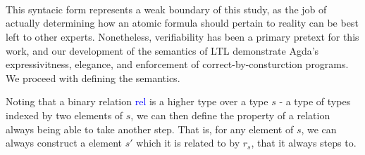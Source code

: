 \documentclass{article}
\newcommand{\blue}[1]{\textcolor{blue}{#1}}
\begin{document}
\begin{code}[hide]%
\>[0]\<%
\\
\>[0]\AgdaSpace{}%
\AgdaSymbol{:}\AgdaSpace{}%
\AgdaSpace{}%
\AgdaSpace{}%
\<%
\\
\>[0]\AgdaSpace{}%
\AgdaSpace{}%
\AgdaSymbol{=}\AgdaSpace{}%
\AgdaSpace{}%
\AgdaSpace{}%
\<%
\\
%
\\[\AgdaEmptyExtraSkip]%
\>[0]\<%
\\
\>[0]\<%
\\
\>[0]\AgdaSpace{}%
\AgdaSymbol{:}\AgdaSpace{}%
\AgdaSpace{}%
\<%
\\
\>[0]\AgdaSpace{}%
\AgdaSpace{}%
\AgdaSymbol{=}\AgdaSpace{}%
\<%
\\
\>[0]\AgdaSpace{}%
\AgdaSpace{}%
\AgdaSymbol{=}\AgdaSpace{}%
\<%
\end{code}

This syntacic form represents a weak boundary of this study, as the job of actually
determining how an atomic formula should pertain to reality can be best left to other
experts. Nonetheless, verifiability has been a primary pretext for this work,
and our development of the semantics of LTL demonstrate Agda's expressivitness,
elegance, and enforcement of correct-by-consturction programs. We proceed with defining the semantics.

Noting that a binary relation \blue{rel} is a higher type over a type $s$ - a
type of types indexed by two elements of $s$, we can then define the property of
a relation always being able to take another step. That is, for any element of
$s$, we can always construct a element $s'$ which it is related to by $r_s$,
that it always steps to.
\end{document}
